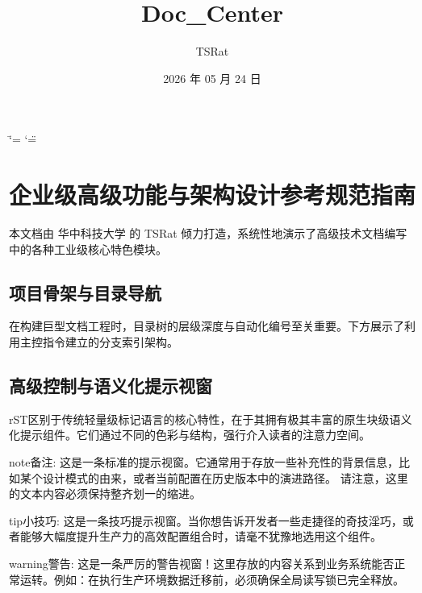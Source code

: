 \documentclass[a4paper,11pt,english]{sphinxmanual}
\title{Doc\_Center}
\date{2026 年 05 月 24 日}
\author{TSRat}
\begin{document}
\ifdefined\shorthandoff
  \ifnum\catcode`\=\string=\active\shorthandoff{=}\fi
  \ifnum\catcode`\"=\active{}\fi
\fi

\pagestyle{empty}
\sphinxmaketitle
\pagestyle{plain}
\sphinxtableofcontents
\pagestyle{normal}
\label{\detokenize{index::doc}}


\sphinxstepscope


\chapter{企业级高级功能与架构设计参考规范指南}
\label{\detokenize{advanced_showcase:id1}}\label{\detokenize{advanced_showcase::doc}}
\sphinxAtStartPar
本文档由 华中科技大学 的 TSRat 倾力打造，系统性地演示了高级技术文档编写中的各种工业级核心特色模块。


\section{项目骨架与目录导航}
\label{\detokenize{advanced_showcase:id2}}
\sphinxAtStartPar
在构建巨型文档工程时，目录树的层级深度与自动化编号至关重要。下方展示了利用主控指令建立的分支索引架构。


\section{高级控制与语义化提示视窗}
\label{\detokenize{advanced_showcase:id3}}
\sphinxAtStartPar
rST区别于传统轻量级标记语言的核心特性，在于其拥有极其丰富的原生块级语义化提示组件。它们通过不同的色彩与结构，强行介入读者的注意力空间。

\begin{sphinxadmonition}{note}{备注:}
\sphinxAtStartPar
这是一条标准的提示视窗。它通常用于存放一些补充性的背景信息，比如某个设计模式的由来，或者当前配置在历史版本中的演进路径。
请注意，这里的文本内容必须保持整齐划一的缩进。
\end{sphinxadmonition}

\begin{sphinxadmonition}{tip}{小技巧:}
\sphinxAtStartPar
这是一条技巧提示视窗。当你想告诉开发者一些走捷径的奇技淫巧，或者能够大幅度提升生产力的高效配置组合时，请毫不犹豫地选用这个组件。
\end{sphinxadmonition}

\begin{sphinxadmonition}{warning}{警告:}
\sphinxAtStartPar
这是一条严厉的警告视窗！这里存放的内容关系到业务系统能否正常运转。例如：在执行生产环境数据迁移前，必须确保全局读写锁已完全释放。
\end{sphinxadmonition}
\end{document}
